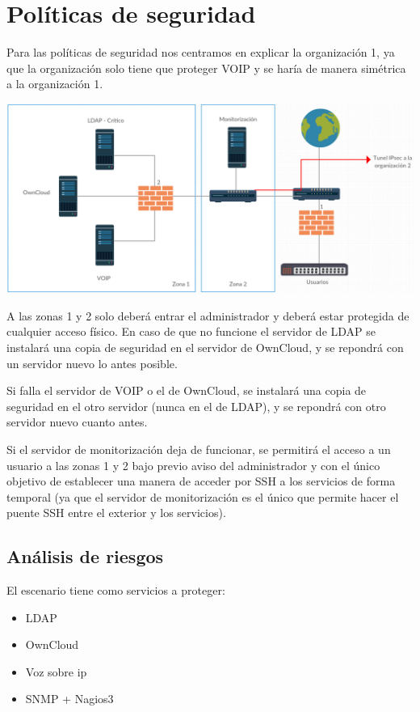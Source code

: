 \documentclass[]{article}
\begin{document}
\section{Políticas de seguridad}
Para las políticas de seguridad nos centramos en explicar la organización 1, ya que la organización solo tiene que proteger VOIP y se haría de manera simétrica a la organización 1.

\begin{center}
	\includegraphics[width=1\linewidth]{images/seguridadorg1}
\end{center}

A las zonas 1 y 2 solo deberá entrar el administrador y deberá estar protegida de cualquier acceso físico. En caso de que no funcione el servidor de LDAP se instalará una copia de seguridad en el servidor de OwnCloud, y se repondrá con un servidor nuevo lo antes posible.

Si falla el servidor de VOIP o el de OwnCloud, se instalará una copia de seguridad en el otro servidor (nunca en el de LDAP), y se repondrá con otro servidor nuevo cuanto antes.

Si el servidor de monitorización deja de funcionar, se permitirá el acceso a un usuario a las zonas 1 y 2 bajo previo aviso del administrador y con el único objetivo de establecer una manera de acceder por SSH a los servicios de forma temporal (ya que el servidor de monitorización es el único que permite hacer el puente SSH entre el exterior y los servicios).

\subsection{Análisis de riesgos}
El escenario tiene como servicios a proteger:

\begin{itemize}
	\item LDAP
	\item OwnCloud
	\item Voz sobre ip
	\item SNMP + Nagios3
\end{itemize}
\end{document}
